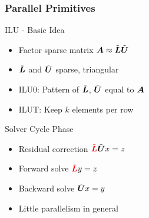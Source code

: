 \begin{frame}[fragile]
\frametitle{Parallel Primitives}

  \begin{minipage}{0.5\textwidth}
    \begin{block}{ILU - Basic Idea}
      \begin{itemize}
        \item Factor sparse matrix $\boldsymbol{A} \approx \tilde{\boldsymbol{L}} \tilde{\boldsymbol{U}}$
        \item $\tilde{\boldsymbol{L}}$ and $\tilde{\boldsymbol{U}}$ sparse, triangular
        \item ILU0: Pattern of $\tilde{\boldsymbol{L}}$, $\tilde{\boldsymbol{U}}$ equal to $\boldsymbol{A}$
        \item ILUT: Keep $k$ elements per row
      \end{itemize}
    \end{block}
  \end{minipage}
%
  \begin{minipage}{0.45\textwidth}
    \begin{block}{Solver Cycle Phase}
      \vspace*{-0.1cm}
      \begin{itemize}
        \item Residual correction ${\color{red}\tilde{\matrix L}} \tilde{\matrix U} x = z$
        \item Forward solve ${\color{red}\tilde{\matrix L}} y = z$
        \item Backward solve $\tilde{\boldsymbol{U}} x = y$
        \item Little parallelism in general
      \end{itemize}
    \end{block}
  \end{minipage}



\end{frame}
